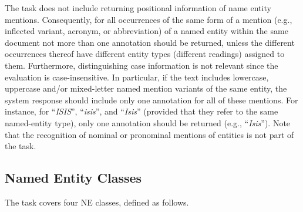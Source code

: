\documentclass[11pt]{article}
\begin{document}
\noindent The task does not include returning positional information of name
entity mentions. Consequently, for all occurrences of the same form of a
mention (e.g., inflected variant, acronym, or abbreviation) of a named entity
within the same document not more than one annotation should be returned,
unless the different occurrences thereof have different entity types (different
readings) assigned to them. Furthermore, distinguishing case information is not
relevant since the evaluation is case-insensitive. In particular, if the text
includes lowercase, uppercase and/or mixed-letter named mention variants of the
same entity, the system response should include only one annotation for all of
these mentions.  For instance, for ``\textit{ISIS}'', ``\textit{isis}'', and
``\textit{Isis}'' (provided that they refer to the same named-entity type),
only one annotation should be returned (e.g., ``\textit{Isis}''). Note that the
recognition of nominal or pronominal mentions of entities is not part of the
task. 

\subsection{Named Entity Classes}

{The task covers four NE classes, defined as follows.}
\end{document}
